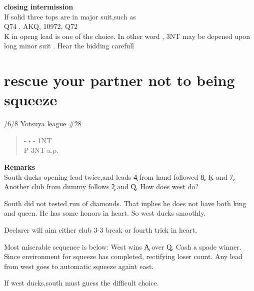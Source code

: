 \vspace{0.5cm}
{\bf closing intermission}\\


If solid three tops are in major suit,such as\\
Q74 , AKQ, 10972, Q72\\
\h K in openg lead is one of the choice.
In other word ,  3NT may be depened upon long minor suit .
Hear the bidding carefull


\section{rescue your partner not to being 
squeeze}

/6/8 Yotsuya league  \#28
\begin{quote}
%
  {}%
  {}%
  {}%
  {}%
\end{quote}
\begin{quote}
\begin{bidding}
- \> -  \> - \> 1NT \\
P \> 3NT \> a.p.
\end{bidding}
\end{quote}
{\bf Remarks}\\

South ducks opening lead twice,and leads \c 4
from hand followed \c 8, \c K and \c 7.
Another club from dummy follows \c 2 and \c Q.
How does west do? 

South did not tested run of diamonds. That inplies
he does not have both king and queen. He has some
honors in heart. So west ducks smoothly.

Declarer will aim either club 3-3 break or 
fourth trick in heart,

Most miserable sequence is below:
West wins \c A over \c Q. Cash a spade winner.
Since environment for squeeze has completed, 
rectifying loser count.
 Any lead 
from west goes to automatic squeeze againt east.

If west ducks,south must guess the difficult choice.



\vspace{0.5cm}

